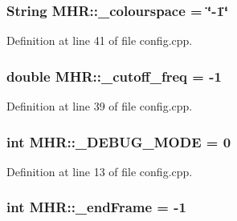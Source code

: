 \hypertarget{namespace_m_h_r_a16dd6a785863f2fac97ebb334606c166}{
\subsubsection[{\+\_\+colourspace}]{\setlength{\rightskip}{0pt plus 5cm}String M\+H\+R\+::\+\_\+colourspace = \char`\"{}-\/1\char`\"{}}}\label{namespace_m_h_r_a16dd6a785863f2fac97ebb334606c166}


Definition at line 41 of file config.\+cpp.

\hypertarget{namespace_m_h_r_a9685359cac4522cd1ee584fbfb5371d1}{
\subsubsection[{\+\_\+cutoff\+\_\+freq}]{\setlength{\rightskip}{0pt plus 5cm}double M\+H\+R\+::\+\_\+cutoff\+\_\+freq = -\/1}}\label{namespace_m_h_r_a9685359cac4522cd1ee584fbfb5371d1}


Definition at line 39 of file config.\+cpp.

\hypertarget{namespace_m_h_r_a2446951af16ca1137edb21f8e07019cb}{
\subsubsection[{\+\_\+\+D\+E\+B\+U\+G\+\_\+\+M\+O\+D\+E}]{\setlength{\rightskip}{0pt plus 5cm}int M\+H\+R\+::\+\_\+\+D\+E\+B\+U\+G\+\_\+\+M\+O\+D\+E = 0}}\label{namespace_m_h_r_a2446951af16ca1137edb21f8e07019cb}


Definition at line 13 of file config.\+cpp.

\hypertarget{namespace_m_h_r_a08d1602abf6cd2454b1f73a8d5523ac2}{
\subsubsection[{\+\_\+end\+Frame}]{\setlength{\rightskip}{0pt plus 5cm}int M\+H\+R\+::\+\_\+end\+Frame = -\/1}}\label{namespace_m_h_r_a08d1602abf6cd2454b1f73a8d5523ac2}


